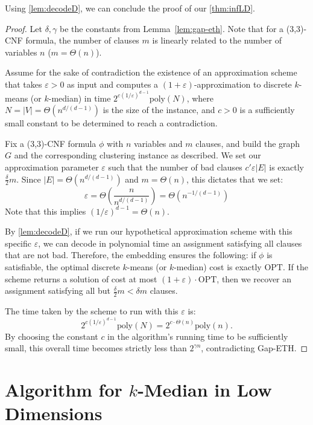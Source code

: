 \documentclass[11pt]{article}
\newcommand{\eps}{\varepsilon}
\newcommand{\poly}{\mathrm{ poly}}
\begin{document}
Using \cref{lem:decodeD}, we can conclude the proof of our \cref{thm:infLD}.
\begin{proof}
Let $\delta, \gamma$ be the constants from Lemma~\ref{lem:gap-eth}. Note that for a (3,3)-CNF formula, the number of clauses $m$ is linearly related to the number of variables $n$ ($m = \Theta(n)$).

Assume for the sake of contradiction the existence of an approximation scheme that takes $\eps > 0$ as input and computes a $(1+\eps)$-approximation to discrete $k$-means (or $k$-median) in time $2^{c(1/\eps)^{d-1}} \poly(N)$, where $N = |V| = \Theta(n^{d/(d-1)})$ is the size of the instance, and $c > 0$ is a sufficiently small constant to be determined to reach a contradiction.

Fix a (3,3)-CNF formula $\phi$ with $n$ variables and $m$ clauses, and build the graph $G$ and the corresponding clustering instance as described. We set our approximation parameter $\eps$ such that the number of bad clauses $c'\eps|E|$ is exactly $\frac{\delta}{2} m$. Since $|E| = \Theta(n^{d/(d-1)})$ and $m = \Theta(n)$, this dictates that we set:
\[ \eps = \Theta\left(\frac{n}{n^{d/(d-1)}}\right) = \Theta(n^{-1/(d-1)}) \]
Note that this implies $(1/\eps)^{d-1} = \Theta(n)$. 

By \cref{lem:decodeD}, if we run our hypothetical approximation scheme with this specific $\eps$, we can decode in polynomial time an assignment satisfying all clauses that are not bad. 
Therefore, the embedding ensures the following: if $\phi$ is satisfiable, the optimal discrete $k$-means (or $k$-median) cost is exactly $\text{OPT}$. If the scheme returns a solution of cost at most $(1+\eps)\cdot\text{OPT}$, then we recover an assignment satisfying all but $\frac{\delta}{2} m < \delta m$ clauses. 

The time taken by the scheme to run with this $\eps$ is:
\[ 2^{c\left(1/\eps\right)^{d-1}} \poly(N) =  2^{c \cdot \Theta(n)} \poly(n). \]
By choosing the constant $c$ in the algorithm's running time to be sufficiently small, this overall time becomes strictly less than $2^{\gamma n}$, contradicting Gap-ETH. 
\end{proof}


{}

\appendix






\section{Algorithm for $k$-Median in Low Dimensions}\label{app:k-med}
\end{document}
